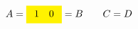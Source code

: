 \documentclass{article}
\begin{document}
\begin{alignat*}{2}
A=\colorbox{yellow}{$\begin{array}{cc}1 &0\end{array}$}&=B &\quad C&=D
\end{alignat*}
\end{document}

